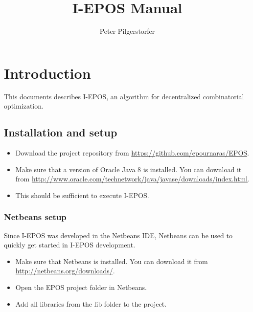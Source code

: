 \documentclass[11pt]{article} %
\title{I-EPOS Manual}
\author{Peter Pilgerstorfer}
\begin{document}
\maketitle

\section{Introduction}
This documents describes I-EPOS, an algorithm for decentralized combinatorial optimization.

\subsection{Installation and setup} \label{sec:setup}
\begin{itemize}
	\item Download the project repository from \url{https://github.com/epournaras/EPOS}.
	\item Make sure that a version of Oracle Java 8 is installed. You can download it from \url{http://www.oracle.com/technetwork/java/javase/downloads/index.html}.
	\item This should be sufficient to execute I-EPOS.
\end{itemize}
\subsubsection*{Netbeans setup}
Since I-EPOS was developed in the Netbeans IDE, Netbeans can be used to quickly get started in I-EPOS development.
\begin{itemize}
	\item Make sure that Netbeans is installed. You can download it from \url{http://netbeans.org/downloads/}.
	\item Open the EPOS project folder in Netbeans.
	\item Add all libraries from the lib folder to the project.
\end{itemize}
\end{document}
